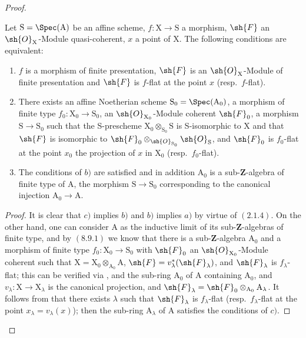 \begin{proof}
\begin{corollary}[11.2.7]
\label{IV.11.2.7}
Let $\mathrm{S}=\Spec(\mathrm{A})$ be an affine scheme, $f:\mathrm{X}\to\mathrm{S}$ a morphism, $\sh{F}$ an $\sh{O}_\mathrm{X}$-Module quasi-coherent, $x$ a point of $\mathrm{X}$. The following conditions are equivalent:
\begin{enumerate}[label=\emph{\alph*)}]
  \item $f$ is a morphism of finite presentation, $\sh{F}$ is an $\sh{O}_\mathrm{X}$-Module of finite presentation and $\sh{F}$ is $f$-flat at the point $x$ (resp.\ $f$-flat).
  \item There exists an affine Noetherian scheme $\mathrm{S}_0=\Spec(\mathrm{A}_0)$, a morphism of finite type $f_0:\mathrm{X}_0\to\mathrm{S}_0$, an $\sh{O}_{\mathrm{X}_0}$-Module coherent $\sh{F}_0$, a morphism $\mathrm{S}\to\mathrm{S}_0$ such that the S-prescheme $\mathrm{X}_0\otimes_{\mathrm{S}_0}\mathrm{S}$ is S-isomorphic to $\mathrm{X}$ and that $\sh{F}$ is isomorphic to $\sh{F}_0\otimes_{\sh{O}_{\mathrm{S}_0}}\sh{O}_\mathrm{S}$, and $\sh{F}_0$ is $f_0$-flat at the point $x_0$ the projection of $x$ in $\mathrm{X}_0$ (resp.\ $f_0$-flat).
  \item The conditions of $b)$ are satisfied and in addition $\mathrm{A}_0$ is a sub-$\mathbf{Z}$-algebra of finite type of $\mathrm{A}$, the morphism $\mathrm{S}\to\mathrm{S}_0$ corresponding to the canonical injection $\mathrm{A}_0\to\mathrm{A}$.
\end{enumerate}
\end{corollary}

\begin{proof}
It is clear that $c)$ implies $b)$ and $b)$ implies $a)$ by virtue of $(2.1.4)$. On the other hand, one can consider $\mathrm{A}$ as the inductive limit of its sub-$\mathbf{Z}$-algebras of finite type, and by $(8.9.1)$ we know that there is a sub-$\mathbf{Z}$-algebra $\mathrm{A}_0$ and a morphism of finite type $f_0:\mathrm{X}_0\to\mathrm{S}_0$ with $\sh{F}_0$ an $\sh{O}_{\mathrm{X}_0}$-Module coherent such that $\mathrm{X}=\mathrm{X}_0\otimes_{\mathrm{A}_0}\mathrm{A}$, $\sh{F}=v^*_\lambda(\sh{F}_\lambda)$, and $\sh{F}_\lambda$ is $f_\lambda$-flat; this can be verified via , and the sub-ring $\mathrm{A}_0$ of $\mathrm{A}$ containing $\mathrm{A}_0$, and $v_\lambda:\mathrm{X}\to\mathrm{X}_\lambda$ is the canonical projection, and $\sh{F}_\lambda=\sh{F}_0\otimes_{\mathrm{A}_0}\mathrm{A}_\lambda$. It follows from  that there exists $\lambda$ such that $\sh{F}_\lambda$ is $f_\lambda$-flat (resp.\ $f_\lambda$-flat at the point $x_\lambda=v_\lambda(x)$); then the sub-ring $\mathrm{A}_\lambda$ of $\mathrm{A}$ satisfies the conditions of $c)$.
\end{proof}


\end{proof}
